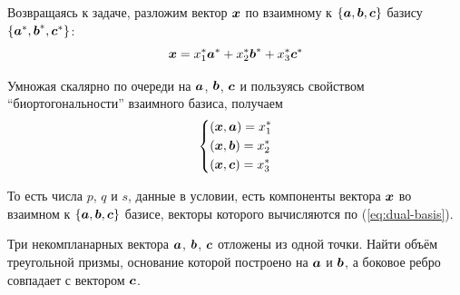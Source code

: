 \documentclass[a4paper,12pt]{article}
\begin{document}
\begin{solution}
    \bigskip
    
    Возвращаясь к задаче, разложим вектор $\boldsymbol x$ по взаимному к $\{\boldsymbol a, \boldsymbol b, \boldsymbol c\}$ базису $\{\boldsymbol a^*, \boldsymbol b^*, \boldsymbol c^*\}$:
    \[
      \boldsymbol x = x_1^* \boldsymbol a^* + x_2^* \boldsymbol b^* + x_3^* \boldsymbol c^*
    \]
    
    Умножая скалярно по очереди на $\boldsymbol a$, $\boldsymbol b$, $\boldsymbol c$ и пользуясь свойством ``биортогональности'' взаимного базиса, получаем
    \[
      \left\{
        \begin{aligned}
          &(\boldsymbol x, \boldsymbol a) = x_1^*\\
          &(\boldsymbol x, \boldsymbol b) = x_2^*\\
          &(\boldsymbol x, \boldsymbol c) = x_3^*
        \end{aligned}
      \right.
    \]
    
    То есть числа $p$, $q$ и $s$, данные в условии, есть компоненты вектора $\boldsymbol x$ во взаимном к $\{\boldsymbol a, \boldsymbol b, \boldsymbol c\}$ базисе, векторы которого вычисляются по (\ref{eq:dual-basis}).
  \end{solution}
  
  
  \begin{problem}[3.22(1)]
    Три некомпланарных вектора $\boldsymbol a$, $\boldsymbol b$, $\boldsymbol c$ отложены из одной точки.
    Найти объём треугольной призмы, основание которой построено на $\boldsymbol a$ и $\boldsymbol b$, а боковое ребро совпадает с вектором $\boldsymbol c$.
  \end{problem}
  
\end{document}
